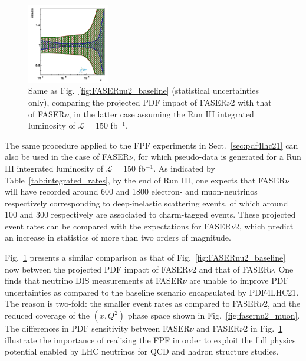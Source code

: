 \begin{figure}[htbp]
	\includegraphics[width=0.32\textwidth]{plots/proton_fasernu2/FASERv2_vs_FASERv/statOnly_FASERv_q2_10000_pdf_s_ratio.pdf}
	\caption{Same as  Fig.~\ref{fig:FASERnu2_baseline} (statistical uncertainties only), comparing
		the projected PDF impact of FASER$\nu$2 with that of FASER$\nu$, in the latter
		case assuming the Run III integrated
		luminosity of $\mathcal{L}=150$ fb$^{-1}$.
	}
	\label{fig:FASERnu2_vs_FASERnu}
\end{figure}

The same procedure applied to the FPF experiments in Sect.~\ref{sec:pdf4lhc21}
can also be used in the case of FASER$\nu$, for which pseudo-data is generated
for a Run III integrated
luminosity of $\mathcal{L}=150$ fb$^{-1}$.
%
As indicated by Table~\ref{tab:integrated_rates}, by the end of Run III, one expects
that FASER$\nu$ will have recorded around 600 and 1800 electron- and muon-neutrinos
respectively corresponding to deep-inelastic scattering events, of which around 100
and 300 respectively are associated to charm-tagged events.
%
These projected event rates can be compared with the expectations for FASER$\nu$2, which predict
an increase in statistics of more than two orders of magnitude.

Fig.~\ref{fig:FASERnu2_vs_FASERnu} presents a similar comparison as that of
Fig.~\ref{fig:FASERnu2_baseline} now between the projected PDF impact of FASER$\nu$2 and that of
FASER$\nu$.
%
One finds that neutrino DIS measurements at FASER$\nu$ are unable to improve
PDF uncertainties as compared to the baseline scenario encapsulated by PDF4LHC21.
%
The reason is two-fold: the smaller event rates as compared to FASER$\nu$2,
and the reduced coverage of the $(x,Q^2)$ phase space shown in Fig.~\ref{fig:fasernu2_muon}.
%
The differences in PDF sensitivity between FASER$\nu$ and FASER$\nu$2 in
Fig.~\ref{fig:FASERnu2_vs_FASERnu} illustrate
the  importance of realising the FPF in order to exploit the full physics potential enabled 
by LHC neutrinos for QCD and hadron structure studies.

